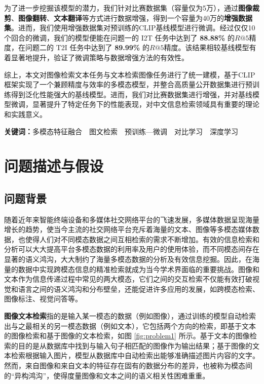 \documentclass[a4paper]{zreport}
\begin{document}
为了进一步挖掘该模型的潜力，我们针对比赛数据集（容量仅为5万），通过\textbf{图像裁剪}、\textbf{图像翻转}、\textbf{文本翻译}等方式进行数据增强，得到一个容量为40万的\textbf{增强数据集}。进而，我们使用增强数据集对预训练的CLIP基线模型进行微调。经过仅仅10个回合的微调，我们的模型便能在问题一的 I2T 任务中达到了 \textbf{88.88\%} 的$R@5$精度，在问题二的 T2I 任务中达到了 \textbf{89.99\%} 的$R@5$精度。该结果相较基线模型有着显著地提升，验证了微调策略与数据增强方法的有效性。

综上，本文对图像检索文本任务与文本检索图像任务进行了统一建模，基于CLIP框架实现了一个兼顾精度与效率的多模态模型，并整合高质量公开数据集进行预训练得到泛化性能强大的基线模型。进而，我们对比赛数据集进行增强，并对基线模型微调，显著提升了特定任务下的性能表现，对中文信息检索领域具有重要的理论和实践意义。


\vspace{0.5em}

\textbf{关键词：}\medspace 多模态特征融合~~图文检索~~预训练—微调~~对比学习~~深度学习

\newpage
\setcounter{page}{1}
\tableofcontents
\newpage

\setcounter{page}{1}

\linespread{1.5}

\section{问题描述与假设}

\subsection{问题背景}

随着近年来智能终端设备和多媒体社交网络平台的飞速发展，多媒体数据呈现海量增长的趋势，使当今主流的社交网络平台充斥着海量的文本、图像等多模态媒体数据，也使得人们对不同模态数据之间互相检索的需求不断增加。有效的信息检索和分析可以大大提高平台多模态数据的利用率及用户的使用体验，而不同模态间存在显著的语义鸿沟，大大制约了海量多模态数据的分析及有效信息挖掘。因此，在海量的数据中实现跨模态信息的精准检索就成为当今学术界面临的重要挑战。图像和文本作为信息传递过程中常见的两大模态，它们之间的交互检索不仅能有效打破视觉和语言之间的语义鸿沟和分布壁垒，还能促进许多应用的发展，如跨模态检索、图像标注、视觉问答等。

\textbf{图像文本检索}指的是输入某一模态的数据（例如图像），通过训练的模型自动检索出与之最相关的另一模态数据（例如文本），它包括两个方向的检索，即基于文本的图像检索和基于图像的文本检索，如图 \ref{fig:problem1} 所示。基于文本的图像检索的目的是从数据库中找到与输入句子相匹配的图像作为输出结果；基于图像的文本检索根据输入图片，模型从数据库中自动检索出能够准确描述图片内容的文字。然而，来自图像和来自文本的特征存在固有的数据分布的差异，也被称为模态间的“异构鸿沟”，使得度量图像和文本之间的语义相关性困难重重。
\end{document}
